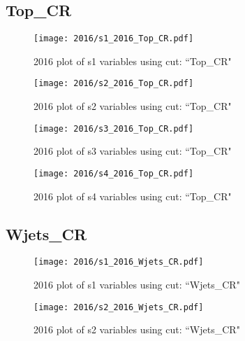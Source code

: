 \documentclass{article}
\begin{document}
      \subsection*{Top\_CR}
                        \begin{figure}[H]
                            \centering
                            \caption{2016 plot of s1 variables using cut: ``Top\_CR"}
                            \texttt{[image: 2016/s1\_2016\_Top\_CR.pdf]}
                        \end{figure}    
                        \begin{figure}[H]
                            \centering
                            \caption{2016 plot of s2 variables using cut: ``Top\_CR"}
                            \texttt{[image: 2016/s2\_2016\_Top\_CR.pdf]}
                        \end{figure}    
                        \begin{figure}[H]
                            \centering
                            \caption{2016 plot of s3 variables using cut: ``Top\_CR"}
                            \texttt{[image: 2016/s3\_2016\_Top\_CR.pdf]}
                        \end{figure}    
                        \begin{figure}[H]
                            \centering
                            \caption{2016 plot of s4 variables using cut: ``Top\_CR"}
                            \texttt{[image: 2016/s4\_2016\_Top\_CR.pdf]}
                        \end{figure}    
      \subsection*{Wjets\_CR}
                        \begin{figure}[H]
                            \centering
                            \caption{2016 plot of s1 variables using cut: ``Wjets\_CR"}
                            \texttt{[image: 2016/s1\_2016\_Wjets\_CR.pdf]}
                        \end{figure}    
                        \begin{figure}[H]
                            \centering
                            \caption{2016 plot of s2 variables using cut: ``Wjets\_CR"}
                            \texttt{[image: 2016/s2\_2016\_Wjets\_CR.pdf]}
                        \end{figure}    
\end{document}
